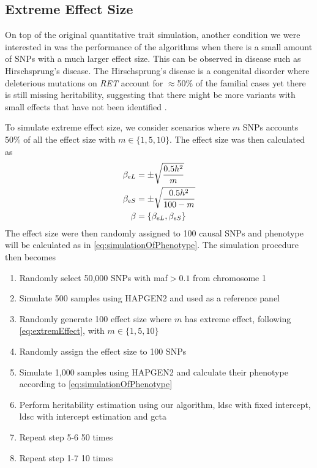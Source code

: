 		\subsection{Extreme Effect Size}
		On top of the original quantitative trait simulation, another condition we were interested in was the performance of the algorithms when there is a small amount of \glspl{SNP} with a much larger effect size.
		This can be observed in disease such as Hirschsprung's disease.
		The Hirschsprung's disease is a congenital disorder where deleterious mutations on \textit{RET} account for $\approx$50\% of the familial cases yet there is still missing heritability, suggesting that there might be more variants with small effects that have not been identified \citep{Gui2013}.
		
		To simulate extreme effect size, we consider scenarios where $m$ \glspl{SNP} accounts 50\% of all the effect size with $m\in\{1,5,10\}$.
		The effect size was then calculated as
		\begin{align}
		\beta_{eL} &= \pm\sqrt{\frac{0.5h^2}{m}} \notag\\
		\beta_{eS} &= \pm\sqrt{\frac{0.5h^2}{100-m}} \notag\\
		\beta &= \{\beta_{eL}, \beta_{eS}\}
		\label{eq:extremEffect}
		\end{align}
		The effect size were then randomly assigned to 100 causal \glspl{SNP} and phenotype will be calculated as in \cref{eq:simulationOfPhenotype}.
		The simulation procedure then becomes
		\begin{enumerate}
			\item Randomly select 50,000 \glspl{SNP} with \gls{maf}$>0.1$ from chromosome 1
			\item Simulate 500 samples using HAPGEN2 and used as a reference panel
			\item Randomly generate 100 effect size where $m$ has extreme effect, following \cref{eq:extremEffect}, with $m\in\{1,5,10\}$
			\item Randomly assign the effect size to 100 \glspl{SNP}
			\item Simulate 1,000 samples using HAPGEN2 and calculate their phenotype according to \cref{eq:simulationOfPhenotype}
			\item Perform heritability estimation using our algorithm, \gls{ldsc} with fixed intercept, \gls{ldsc} with intercept estimation and \gls{gcta}
			\item Repeat step 5-6 50 times
			\item Repeat step 1-7 10 times
		\end{enumerate}
		
